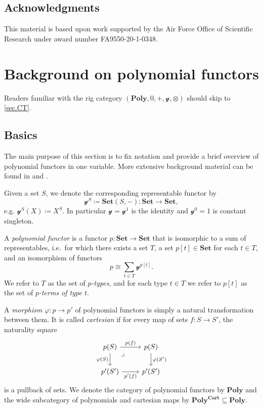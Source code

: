 \documentclass[11pt, one side, article]{memoir}
\theoremstyle{definition}
\theoremstyle{plain}
\newenvironment{definition}
  {\pushQED{\qed}\renewcommand{\qedsymbol}{$\lozenge$}\definitionx}
  {\popQED\enddefinitionx}
\renewcommand{\ss}{\subseteq}
\newcommand{\Cat}[1]{\mathbf{#1}}%
\newcommand{\smset}{\Cat{Set}}
\newcommand{\yon}{\mathcal{y}}
\newcommand{\poly}{\Cat{Poly}}
\newcommand{\polycart}{\poly^{\Cat{Cart}}}
\newcommand{\0}{\textsf{0}}
\newcommand{\1}{\tn{\textsf{1}}}
\begin{document}
\section*{Acknowledgments}
This material is based upon work supported by the Air Force Office of Scientific Research under award number FA9550-20-1-0348.

\chapter{Background on polynomial functors}\label{chap.background}

Readers familiar with the rig category $(\poly,0,+,\yon,\otimes)$ should skip to \cref{sec.CT}.

\section{Basics}


The main purpose of this section is to fix notation and provide a brief overview of polynomial functors in one variable. More extensive background material can be found in \cite{spivak2022poly} and \cite{kock2012polynomial}. 

\begin{definition}[Polynomial functor]\label{def.poly}
Given a set $S$, we denote the corresponding representable functor by
\[\yon^S\coloneqq\smset(S,-)\colon\smset\to\smset,\]
e.g. $\yon^S(X)\coloneqq X^S$. In particular $\yon=\yon^1$ is the identity and $\yon^0=1$ is constant singleton.

A \emph{polynomial functor} is a functor $p\colon\smset\to\smset$ that is isomorphic to a sum of representables, i.e.\ for which there exists a set $T$, a set $p[t]\in\smset$ for each $t\in T$, and an isomorphism of functors
\[
p\cong\sum_{t\in T}\yon^{p[t]}.
\]
We refer to $T$ as the set of \emph{$p$-types}, and for each type $t\in T$ we refer to $p[t]$ as the set of \emph{$p$-terms of type $t$}.%

A \emph{morphism} $\varphi\colon p\to p'$ of polynomial functors is simply a natural transformation between them. It is called \emph{cartesian} if for every map of sets $f\colon S\to S'$, the naturality square
\[
\begin{tikzcd}
  p(S)\ar[r, "p(f)"]\ar[d, "\varphi(S)"']&p(S)\ar[d, "\varphi(S')"]\\
  p'(S')\ar[r, "p'(f)"']&p'(S')\ar[ul, phantom, very near end, "\lrcorner"]
\end{tikzcd}
\]
is a pullback of sets. We denote the category of polynomial functors by $\poly$ and the wide subcategory of polynomials and cartesian maps by $\polycart\ss\poly$.\end{definition}
\end{document}
